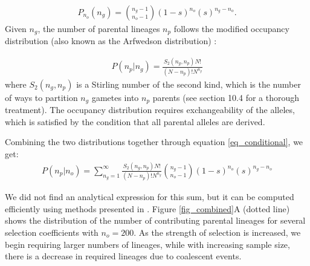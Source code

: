 \documentclass[9pt,twocolumn,twoside,lineno]{gsajnl}
\begin{document}
\begin{equation}
  \begin{aligned}
    \label{eq_neg_binomial_trials}
    P_{n_o}(n_g) = \binom{n_g-1}{n_o-1}(1-s)^{n_o}(s)^{n_g-n_o}.
  \end{aligned}
\end{equation}
Given $n_g$, the number of parental lineages $n_p$ follows the modified occupancy distribution
(also known as the Arfwedson distribution) \citep{Wakeley2009,ONeill2019,JohnsonEtAl2005}:

\begin{equation}
  \begin{aligned}
    \label{eq_occupancy}
    P(n_p|n_g) = \frac{S_2(n_g,n_p) N!}{(N-n_p)! N^{n_g}}
  \end{aligned}
\end{equation}
where $S_2(n_g,n_p)$ is a Stirling number of the second kind, which is the number of ways to
partition $n_g$ gametes into $n_p$ parents (see \cite{JohnsonEtAl2005} section 10.4 for a thorough
treatment).
The occupancy distribution requires exchangeability of the alleles, which is satisfied by the
condition that all parental alleles are derived.

Combining the two distributions together through equation \ref{eq_conditional}, we get:
\begin{equation}
  \begin{aligned}
    \label{eq_lineages_in_past}
    P(n_p|n_o) = \sum_{n_g=1}^{\infty} \frac{S_2(n_g,n_p) N!}{(N-n_p)! N^{n_g}} \binom{n_g-1}{n_o-1}(1-s)^{n_o}(s)^{n_g-n_o}
  \end{aligned}
\end{equation}

We did not find an analytical expression for this sum, but it can be computed
efficiently using methods presented in \citep{ONeill2019}. Figure \ref{fig_combined}A (dotted line) shows
the distribution of the number of contributing parental lineages for several selection coefficients
with $n_o=200$.
As the strength of selection
is increased, we begin requiring larger numbers of lineages, while with increasing sample size,
there is a decrease in required lineages due to coalescent events.
\end{document}

